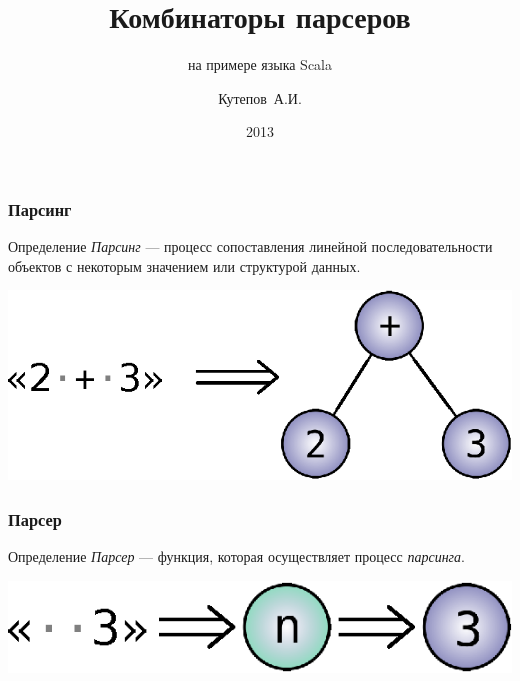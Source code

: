 \documentclass{beamer}
\title{Комбинаторы парсеров}
\subtitle{на примере языка Scala}
\author{Кутепов~А.И.}
\date{2013}
\begin{document}
\begin{frame}
  \titlepage
\end{frame}

\begin{frame}
  \frametitle{Парсинг}

  \begin{block}{Определение}
    \textit{Парсинг} --- процесс сопоставления линейной
    последовательности объектов с некоторым значением или структурой
    данных.
  \end{block}

  \pause

  \begin{center}
    \includegraphics{images/parsing-example.eps}
  \end{center}
\end{frame}

\begin{frame}
  \frametitle{Парсер}

  \begin{block}{Определение}
    \textit{Парсер} --- функция, которая осуществляет процесс
    \textit{парсинга}.
  \end{block}

  \pause

  \vspace{0.5in}
  \begin{center}
    \includegraphics{images/parser-example.eps}
  \end{center}
\end{frame}
\end{document}
